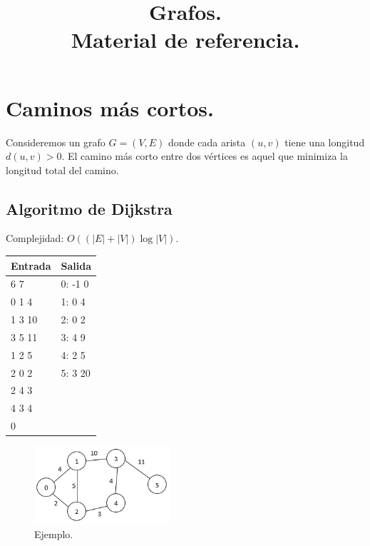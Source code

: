 \documentclass[12pt, letterpaper, twoside]{article}
\title{Grafos.\\Material de referencia.}
\author{}
\date{}
\begin{document}
\maketitle

\tableofcontents

\newpage

\section{Caminos más cortos.}

Consideremos un grafo $G = (V, E)$ donde cada arista $(u, v)$ tiene una longitud $d(u,v) > 0$. El camino más corto entre dos vértices es aquel que minimiza la longitud total del camino.

\subsection{Algoritmo de Dijkstra}

Complejidad: $O((|E| + |V|) \log|V|)$.

 \medskip

\begin{tabular}{|p{7cm}|p{7cm}|}
\hline
\textbf{Entrada} & \textbf{Salida}\\ \hline
6 7    & 0: -1 0\\
0 1 4  & 1: 0 4\\
1 3 10 & 2: 0 2\\
3 5 11 & 3: 4 9\\
1 2 5  & 4: 2 5\\
2 0 2  & 5: 3 20\\
2 4 3  & \\
4 3 4  & \\
0      & \\ \hline
\end{tabular}

\begin{figure}[h]
\centering
\includegraphics[width = 0.45\textwidth]{ShortestPath.png}

\caption{Ejemplo.}
\end{figure}
\end{document}
